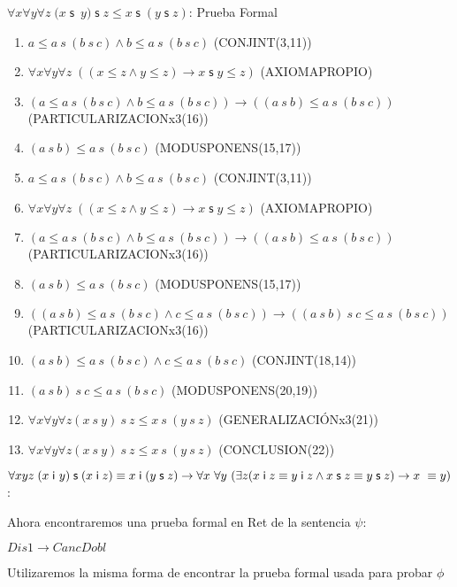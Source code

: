 \documentclass[10pt]{beamer}
\newcounter{saveenumi}
\newcommand{\seti}{\setcounter{saveenumi}{\value{enumi}}}
\newcommand{\conti}{\setcounter{enumi}{\value{saveenumi}}}
\newcommand{\Cfontb}{\fontsize{5.7}{9.5}\selectfont}
\newcommand{\Cfonti}{\fontsize{8.5}{7.2}\selectfont}
\newcommand{\Nand}{\wedge}
\newcommand{\sLesCot}{\forall x\forall y\forall z\;\left( (x\leq
z\wedge y\leq z)\rightarrow x\;\text{$\mathsf{s\;}$}y\leq z\right)}
\newcommand{\assoc}{\forall x\forall y\forall
z\;(x\;\mathsf{s}$\ $y)\;\mathsf{s}\;z\leq x\;\mathsf{s}\;(y\;\mathsf{s}\;z)}
\newcommand{\acot}{Dis1\rightarrow CancDobl}
\newcommand{\idistr}{\forall xyz\;(x\;\mathsf{i}\
y)\;\mathsf{s}\;(x\;\mathsf{i}\;z)\equiv x\;\mathsf{i}\;(y\;\mathsf{s}%
\;z)}
\newcommand{\myconj}{x\;\mathsf{i}\;z\equiv y\;\mathsf{%
i}\;z\wedge x\;\mathsf{s}\;z\equiv y\;\mathsf{s}\;z}
\begin{document}
\begin{frame}{$\assoc$: Prueba Formal}
\Cfontb

\begin{enumerate}[<+->]
  \conti
  \item $ a \leq a\ s\ (b\ s\ c) \Nand b \leq a\ s\ (b\ s\ c)$ \hfill(CONJINT(3,11))
  \item $ \sLesCot $ \hfill(AXIOMAPROPIO)
  \item $ (a \leq a\ s\ (b\ s\ c) \Nand b \leq a\ s\ (b\ s\ c)) \rightarrow ((a\ s\ b) \leq a\ s\ (b\ s\ c)) $ \hfill(PARTICULARIZACIONx3(16))
  \item $ (a\ s\ b) \leq a\ s\ (b\ s\ c)$ \hfill(MODUSPONENS(15,17))

  \item $ a \leq a\ s\ (b\ s\ c) \Nand b \leq a\ s\ (b\ s\ c)$ \hfill(CONJINT(3,11))
  \item $ \sLesCot $ \hfill(AXIOMAPROPIO)
  \item $ (a \leq a\ s\ (b\ s\ c) \Nand b \leq a\ s\ (b\ s\ c)) \rightarrow ((a\ s\ b) \leq a\ s\ (b\ s\ c)) $ \hfill(PARTICULARIZACIONx3(16))
  \item $ (a\ s\ b) \leq a\ s\ (b\ s\ c)$ \hfill(MODUSPONENS(15,17))
  \item $ ((a\ s\ b) \leq a\ s\ (b\ s\ c) \Nand c \leq a\ s\ (b\ s\ c)) \rightarrow ((a\ s\ b)\ s\ c \leq a\ s\ (b\ s\ c)) $ \hfill(PARTICULARIZACIONx3(16))
  \item $ (a\ s\ b) \leq a\ s\ (b\ s\ c) \Nand c \leq a\ s\ (b\ s\ c) $ \hfill(CONJINT(18,14))
  \item $ (a\ s\ b)\ s\ c \leq a\ s\ (b\ s\ c) $ \hfill(MODUSPONENS(20,19))
  \item $ \forall x \forall y \forall z (x\ s\ y)\ s\ z \leq x\ s\ (y\ s\ z)$ \hfill(GENERALIZACIÓNx3(21))
  \item $ \forall x \forall y \forall z (x\ s\ y)\ s\ z \leq x\ s\ (y\ s\ z)$ \hfill(CONCLUSION(22))
  \seti
\end{enumerate}

\end{frame}



\begin{frame}{\Cfonti$\idistr \rightarrow \forall x\ \forall y\ (\exists z (\myconj) \rightarrow x\ \equiv y)$:}

  Ahora encontraremos una prueba formal en Ret de la sentencia $\psi$:
  \begin{center}
    $\acot$
  \end{center}
  \pause
  Utilizaremos la misma forma de encontrar la prueba formal usada para probar
  $\phi$

\end{frame}
\end{document}
